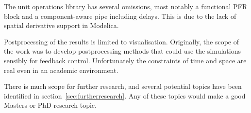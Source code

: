 The unit operations library has several omissions, most notably a functional PFR block and a component-aware pipe including delays.  
This is due to the lack of spatial derivative support in Modelica.

Postprocessing of the results is limited to visualisation.
Originally, the scope of the work was to develop postprocessing methods that could use the simulations sensibly for feedback control.
Unfortunately the constraints of time and space are real even in an academic environment.

There is much scope for further research, and several potential topics have been identified in section~\ref{sec:furtherresearch}.
Any of these topics would make a good Masters or PhD research topic.


